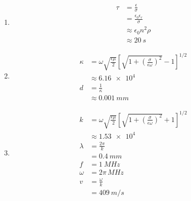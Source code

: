 \documentclass{article}
\begin{document}
\begin{enumerate}
  \item

        \begin{align*}
          \tau & = \frac{\epsilon}{\sigma}              \\
               & = \frac{\epsilon_0 \epsilon_r}{\sigma} \\
               & \approx \epsilon_0 n^2 \rho            \\
               & \approx \qty{20}{s}
        \end{align*}

  \item

        \begin{align*}
          \kappa & = \omega \sqrt{\frac{\epsilon \mu}{2}} \left[ \sqrt{1 + \left( \frac{\sigma}{\epsilon \omega} \right)^2} - 1 \right]^{1 / 2} \\
                 & \approx \num{6.16e4}                                                                                                         \\
          d      & = \frac{1}{\kappa}                                                                                                           \\
                 & \approx \qty{0.001}{mm}
        \end{align*}

  \item

        \begin{align*}
          k       & = \omega \sqrt{\frac{\epsilon \mu}{2}} \left[ \sqrt{1 + \left( \frac{\sigma}{\epsilon \omega} \right)^2} + 1 \right]^{1 / 2} \\
                  & \approx \num{1.53e4}                                                                                                         \\
          \lambda & = \frac{2 \pi}{k}                                                                                                            \\
                  & = \qty{0.4}{mm}                                                                                                              \\
          f       & = \qty{1}{MHz}                                                                                                               \\
          \omega  & = 2 \pi \,\unit{MHz}                                                                                                         \\
          v       & = \frac{\omega}{k}                                                                                                           \\
                  & = \qty{409}{m/s}
        \end{align*}
\end{enumerate}
\end{document}
